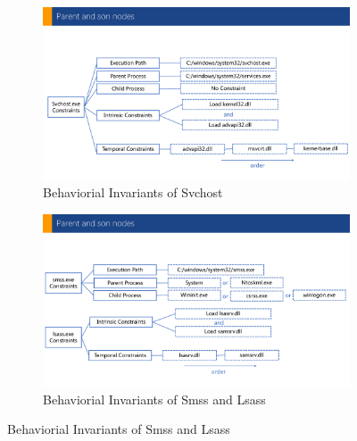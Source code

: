 \begin{figure}[h]
  \begin{subfigure}{.5\textwidth}
      \includegraphics[width=\textwidth]{figs/svchost_constraints.pdf}
      \caption{Behaviorial Invariants of Svchost}
      \label{fig:cons-svchost}
  \end{subfigure}
  \hfill
  \begin{subfigure}{.5\textwidth}
      \includegraphics[width=\textwidth]{figs/smss_lsass_constraints.pdf}
      \caption{Behaviorial Invariants of Smss and Lsass}
      \label{fig:cons-smss-lsass}
  \end{subfigure}


\end{figure}

